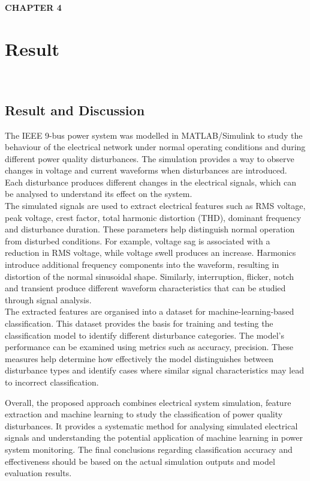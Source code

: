 \documentclass[12pt]{article}
\begin{document}
\begin{center}
\begin{enumerate}
\begin{center}
    \vspace{1.5cm}
    \textbf{\LARGE CHAPTER 4}\\[1.5cm]
\end{center}
\section{Result}\\
\subsection{Result and Discussion}

\raggedright
\justifying
The IEEE 9-bus power system was modelled in MATLAB/Simulink to study the behaviour of the electrical network under normal operating conditions and during different power quality disturbances. The simulation provides a way to observe changes in voltage and current waveforms when disturbances are introduced. Each disturbance produces different changes in the electrical signals, which can be analysed to understand its effect on the system.\\

The simulated signals are used to extract electrical features such as RMS voltage, peak voltage, crest factor, total harmonic distortion (THD), dominant frequency and disturbance duration. These parameters help distinguish normal operation from disturbed conditions. For example, voltage sag is associated with a reduction in RMS voltage, while voltage swell produces an increase. Harmonics introduce additional frequency components into the waveform, resulting in distortion of the normal sinusoidal shape. Similarly, interruption, flicker, notch and transient produce different waveform characteristics that can be studied through signal analysis.\\

The extracted features are organised into a dataset for machine-learning-based classification. This dataset provides the basis for training and testing the classification model to identify different disturbance categories. The model's performance can be examined using metrics such as accuracy, precision. These measures help determine how effectively the model distinguishes between disturbance types and identify cases where similar signal characteristics may lead to incorrect classification.

Overall, the proposed approach combines electrical system simulation, feature extraction and machine learning to study the classification of power quality disturbances. It provides a systematic method for analysing simulated electrical signals and understanding the potential application of machine learning in power system monitoring. The final conclusions regarding classification accuracy and effectiveness should be based on the actual simulation outputs and model evaluation results.\\





\end{enumerate}
\end{center}
\end{document}
